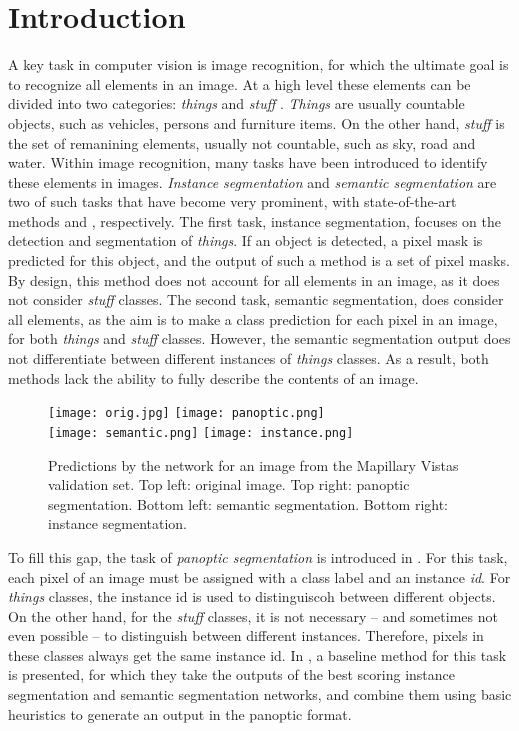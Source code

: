 \documentclass[10pt,twocolumn,letterpaper]{article}
\begin{document}
\section{Introduction}
A key task in computer vision is image recognition, for which the ultimate goal is to recognize all elements in an image. At a high level these elements can be divided into two categories: \textit{things} and \textit{stuff} \cite{Forsyth1996}. \textit{Things} are usually countable objects, such as vehicles, persons and furniture items. On the other hand, \textit{stuff} is the set of remanining elements, usually not countable, such as sky, road and water. Within image recognition, many tasks have been introduced to identify these elements in images. \textit{Instance segmentation} and \textit{semantic segmentation} are two of such tasks that have become very prominent, with state-of-the-art methods \cite{He2017, Liu2018} and \cite{Chen2018a, Zhao2017}, respectively. The first task, instance segmentation, focuses on the detection and segmentation of \textit{things}. If an object is detected, a pixel mask is predicted for this object, and the output of such a method is a set of pixel masks. By design, this method does not account for all elements in an image, as it does not consider \textit{stuff} classes. The second task, semantic segmentation, does consider all elements, as the aim is to make a class prediction for each pixel in an image, for both \textit{things} and \textit{stuff} classes. However, the semantic segmentation output does not differentiate between different instances of \textit{things} classes. As a result, both methods lack the ability to fully describe the contents of an image. 

\begin{figure}[t]
\centering
\texttt{[image: orig.jpg]}
\texttt{[image: panoptic.png]}\\
\texttt{[image: semantic.png]}
\texttt{[image: instance.png]}
\caption{Predictions by the network for an image from the Mapillary Vistas validation set. Top left: original image. Top right: panoptic segmentation. Bottom left: semantic segmentation. Bottom right: instance segmentation.}
\label{fig:intro_example_images}
\end{figure}

To fill this gap, the task of \textit{panoptic segmentation} is introduced in \cite{Kirillov2018}. For this task, each pixel of an image must be assigned with a class label and an instance \textit{id}. For \textit{things} classes, the instance id is used to distinguiscoh between different objects. On the other hand, for the \textit{stuff} classes, it is not necessary -- and sometimes not even possible -- to distinguish between different instances. Therefore, pixels in these classes always get the same instance id. In \cite{Kirillov2018}, a baseline method for this task is presented, for which they take the outputs of the best scoring instance segmentation and semantic segmentation networks, and combine them using basic heuristics to generate an output in the panoptic format.
\end{document}

